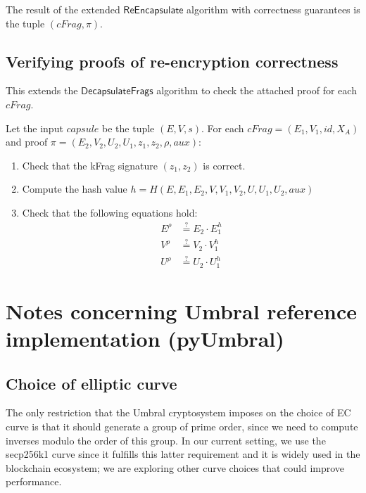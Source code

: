 \documentclass{amsart}
\begin{document}
The result of the extended $\mathsf{ReEncapsulate}$ algorithm with correctness guarantees is the tuple $(cFrag, \pi)$. 
 
\subsection{Verifying proofs of re-encryption correctness}

This extends the $\mathsf{DecapsulateFrags}$ algorithm to check the attached proof for each $cFrag$. 

Let the input $capsule$ be the tuple $(E,V,s)$. For each $cFrag = (E_1, V_1, id, X_A)$ and proof $\pi = (E_2, V_2, U_2, U_1, z_1, z_2, \rho, aux)$:
 \begin{enumerate}
    \item Check that the kFrag signature $(z_1, z_2)$ is correct. 
    \item Compute the hash value $h = H(E, E_1, E_2, V, V_1, V_2, U, U_1, U_2, aux)$
    \item Check that the following equations hold:
    \begin{align*} 
E^{\rho} &\stackrel{?}{=} E_2 \cdot E_1^h \\ 
V^{\rho} &\stackrel{?}{=} V_2 \cdot V_1^h \\
U^{\rho} &\stackrel{?}{=} U_2 \cdot U_1^h
\end{align*}
 \end{enumerate}





\section{Notes concerning Umbral reference implementation (\textsf{pyUmbral})}

\subsection{Choice of elliptic curve}
The only restriction that the Umbral cryptosystem imposes on the choice of EC curve is that it should generate a group of prime order, since we need to compute inverses modulo the order of this group. In our current setting, we use the \textsf{secp256k1} curve since it fulfills this latter requirement and it is widely used in the blockchain ecosystem; we are exploring other curve choices that could improve performance. 
\end{document}
